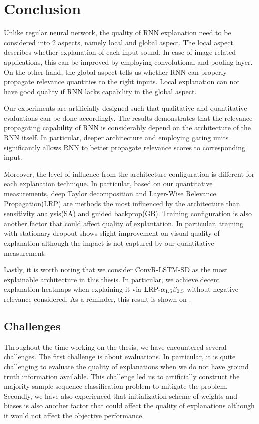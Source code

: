 \chapter{Conclusion}
\label{cha:chapter5}
 Unlike regular neural network, the quality of RNN explanation need to be considered into 2 aspects, namely local and global aspect. The local aspect describes whether explanation of each input sound. In case of image related applications, this can be improved by employing convolutional and pooling layer. On the other hand, the global aspect tells us whether RNN can properly propagate relevance quantities to the right inputs. Local explanation can not have good quality if RNN lacks capability in the global aspect.

Our experiments are artificially designed such that qualitative and quantitative evaluations can be done accordingly.  The results demonstrates that the relevance propagating capability of RNN is considerably depend on the architecture of the RNN itself. In particular, deeper architecture and employing gating units significantly allows RNN to better propagate relevance scores to corresponding input. 


Moreover, the level of  influence from the architecture configuration is different for each explanation technique. In particular, based on our quantitative measurements, deep Taylor decomposition and Layer-Wise Relevance Propagation(LRP) are methods the most influenced by the architecture than sensitivity analysis(SA) and guided backprop(GB).  Training configuration is also another factor that could affect quality of explantation. In particular, training with stationary dropout shows slight improvement on visual quality of explanation although the impact is not captured by our quantitative measurement.

Lastly, it is worth noting that we consider ConvR-LSTM-SD as the most explainable architecture in this thesis. In particular, we achieve decent explanation heatmaps when explaining it via $\text{LRP-}\alpha_{1.5}\beta_{0.5}$ without negative relevance considered. As a reminder, this result is shown on \addfigure{\ref{fig:heatmap_msc_convrlstm_pos_rel}}.

\section{Challenges}
Throughout the time working on the thesis, we have encountered several challenges. The first challenge is about evaluations. In particular, it is quite challenging to evaluate the quality of explanations when we do not have ground truth information available. This challenge led us to artificially construct the majority sample sequence classification problem to mitigate the problem.  Secondly, we have also experienced that initialization scheme of weights and biases is also another factor that could affect the quality of explanations although it would not affect the objective performance.


